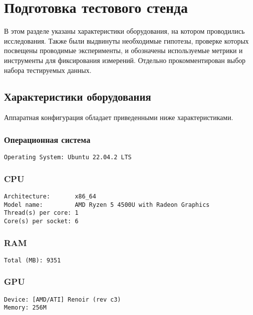 
\section{Подготовка тестового стенда}
\noindent В этом разделе указаны характеристики оборудования, на котором проводились исследования. Также были выдвинуты необходимые гипотезы, проверке которых посвещены проводимые эксперименты, и обозначены используемые метрики и инструменты для фиксирования измерений. Отдельно прокомментирован выбор набора тестируемых данных.



\subsection{Характеристики оборудования}
\noindent Аппаратная конфигурация обладает приведенными ниже характеристиками.
\subsubsection*{Операционная система}

\begin{verbatim}
Operating System: Ubuntu 22.04.2 LTS
\end{verbatim}

\subsubsection*{CPU}
\begin{verbatim}
Architecture:       x86_64
Model name:         AMD Ryzen 5 4500U with Radeon Graphics
Thread(s) per core: 1
Core(s) per socket: 6
\end{verbatim}

\subsubsection*{RAM}
\begin{verbatim}
Total (MB): 9351
\end{verbatim}

\subsubsection*{GPU}
\begin{verbatim}
Device: [AMD/ATI] Renoir (rev c3)
Memory: 256M
\end{verbatim}

